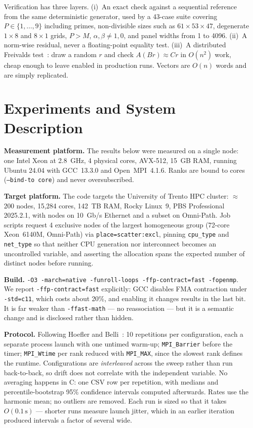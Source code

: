 \documentclass[conference,10pt]{IEEEtran}
\begin{document}
Verification has three layers. (i)~An exact check against a sequential reference from the same
deterministic generator, used by a 43-case suite covering $P\in\{1,\dots,9\}$
including primes, non-divisible sizes such as $61\!\times\!53\!\times\!47$,
degenerate $1\!\times\!8$ and $8\!\times\!1$ grids, $P > M$, $\alpha,\beta \neq 1,0$,
and panel widths from 1 to 4096. (ii)~A norm-wise residual, never a
floating-point equality test. (iii)~A distributed Freivalds
test~\cite{freivalds1979}: draw a random $r$ and check
$A(Br) \approx Cr$ in $O(n^2)$ work, cheap enough to leave enabled in
production runs. Vectors are $O(n)$ words and are simply replicated.

\section{Experiments and System Description}

\textbf{Measurement platform.} The results below were measured on a single
node: one Intel Xeon at 2.8~GHz, 4 physical cores, AVX-512, 15~GB RAM, running
Ubuntu 24.04 with GCC~13.3.0 and Open~MPI~4.1.6. Ranks are bound to cores
(\texttt{--bind-to core}) and never oversubscribed.

\textbf{Target platform.} The code targets the University of Trento HPC
cluster: $\approx$200 nodes, 15{,}284 cores, 142~TB RAM, Rocky Linux~9, PBS
Professional 2025.2.1, with nodes on 10~Gb/s Ethernet and a subset on
Omni-Path. Job scripts request 4 exclusive nodes of the largest homogeneous
group (72-core Xeon~6140M, Omni-Path) via
\texttt{place=scatter:excl}, pinning \texttt{cpu\_type} and \texttt{net\_type}
so that neither CPU generation nor interconnect becomes an uncontrolled
variable, and asserting the allocation spans the expected number of distinct
nodes before running.

\textbf{Build.} \texttt{-O3 -march=native -funroll-loops -ffp-contract=fast
-fopenmp}. We report \texttt{-ffp-contract=fast} explicitly: GCC disables FMA
contraction under \texttt{-std=c11}, which costs about 20\%, and enabling it
changes results in the last bit. It is far weaker than \texttt{-ffast-math} ---
no reassociation --- but it is a semantic change and is disclosed rather than
hidden.

\textbf{Protocol.} Following Hoefler and Belli~\cite{hoefler2015}: 10
repetitions per configuration, each a separate process launch with one
untimed warm-up; \texttt{MPI\_Barrier} before the timer; \texttt{MPI\_Wtime}
per rank reduced with \texttt{MPI\_MAX}, since the slowest rank defines the
runtime. Configurations are \emph{interleaved} across the sweep rather than run
back-to-back, so drift does not correlate with the independent variable. No
averaging happens in C: one CSV row per repetition, with medians and
percentile-bootstrap 95\% confidence intervals computed afterwards. Rates use
the harmonic mean; no outliers are removed. Each run is sized so that it takes
$O(0.1\,\mathrm{s})$ --- shorter runs measure launch jitter, which in an
earlier iteration produced intervals a factor of several wide.
\end{document}

